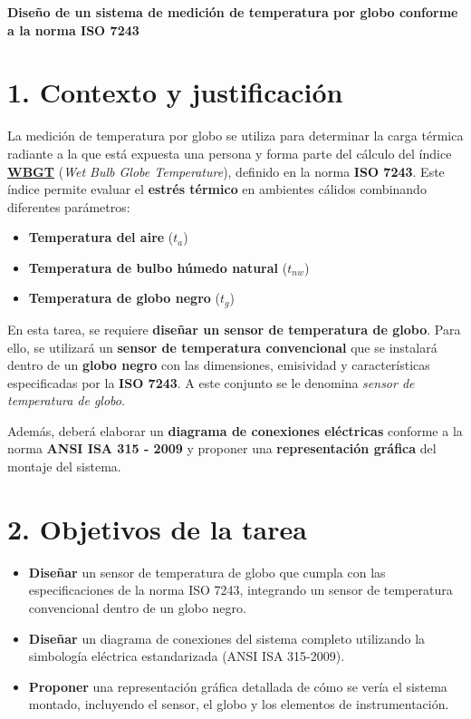 \documentclass[11pt]{article}
\begin{document}
\setlength{\parindent}{0em}

\textbf{Diseño de un sistema de medición de temperatura por globo conforme a la norma ISO 7243}

\section*{1. Contexto y justificación}
La medición de temperatura por globo se utiliza para determinar la carga térmica radiante a la que está expuesta una persona y forma parte del cálculo del índice \href{https://www.youtube.com/watch?v=EIJeJcLun7Y}{\textbf{WBGT}} (\textit{Wet Bulb Globe Temperature}), definido en la norma \textbf{ISO 7243}. Este índice permite evaluar el \textbf{estrés térmico} en ambientes cálidos combinando diferentes parámetros:

\begin{itemize}
    \item \textbf{Temperatura del aire} ($t_a$)
    \item \textbf{Temperatura de bulbo húmedo natural} ($t_{nw}$)
    \item \textbf{Temperatura de globo negro} ($t_g$)
\end{itemize}

En esta tarea, se requiere \textbf{diseñar un sensor de temperatura de globo}. Para ello, se utilizará un \textbf{sensor de temperatura convencional} que se instalará dentro de un \textbf{globo negro} con las dimensiones, emisividad y características especificadas por la \textbf{ISO 7243}. A este conjunto se le denomina \textit{sensor de temperatura de globo}.  

Además, deberá elaborar un \textbf{diagrama de conexiones eléctricas} conforme a la norma \textbf{ANSI ISA 315 - 2009} y proponer una \textbf{representación gráfica} del montaje del sistema.

\section*{2. Objetivos de la tarea}
\begin{itemize}
    \item \textbf{Diseñar} un sensor de temperatura de globo que cumpla con las especificaciones de la norma ISO 7243, integrando un sensor de temperatura convencional dentro de un globo negro.
    \item \textbf{Diseñar} un diagrama de conexiones del sistema completo utilizando la simbología eléctrica estandarizada (ANSI ISA 315-2009).
    \item \textbf{Proponer} una representación gráfica detallada de cómo se vería el sistema montado, incluyendo el sensor, el globo y los elementos de instrumentación.
\end{itemize}
\end{document}
